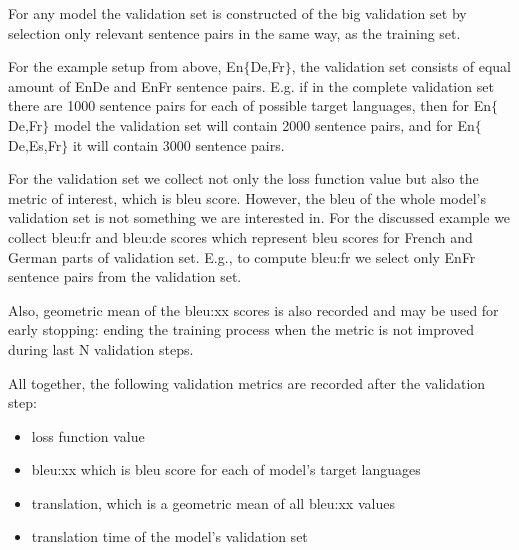 For any model the validation set is constructed of the big validation set
by selection only relevant sentence pairs in the same way, as the training set.

For the example setup from above, En\to{}$\{$De,Fr$\}$, the validation set
consists of equal amount of En\to{}De and En\to{}Fr sentence pairs.
E.g. if in the complete validation set there are 1000 sentence pairs for
each of possible target languages, then for En\to{}$\{$De,Fr$\}$
model the validation set will contain 2000 sentence pairs, and for
En\to{}$\{$De,Es,Fr$\}$ it will contain 3000 sentence pairs.

For the validation set we collect not only the loss function value
but also the metric of interest, which is \acrshort{bleu} score.
However, the \acrshort{bleu} of the whole model's validation set
is not something we are interested in.
For the discussed example we collect bleu:fr and bleu:de scores
which represent \acrshort{bleu} scores for French and German
parts of validation set.
E.g., to compute bleu:fr we select only En\to{}Fr sentence pairs from the
validation set.

Also, geometric mean of the bleu:xx scores is also recorded and may be used
for early stopping: ending the training process when the metric is not
improved during last N validation steps.

\begin{samepage}
All together, the following validation metrics are recorded after the
validation step:
\begin{itemize}
	\item loss function value
	\item bleu:xx which is \acrshort{bleu} score for each of
	model's target languages
	\item translation, which is a geometric mean of all bleu:xx
	values
	\item translation time of the model's validation set
\end{itemize}
\end{samepage}


\subsection{}



\subsection{}





